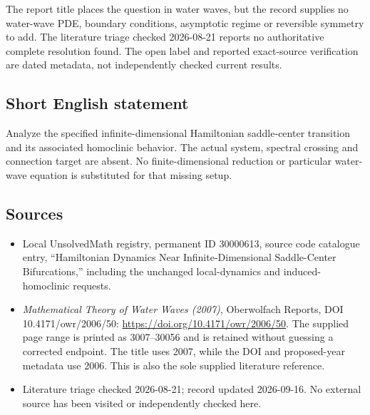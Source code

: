 \documentclass[11pt]{article}
\begin{document}
The report title places the question in water waves, but the record supplies no water-wave PDE, boundary conditions, asymptotic regime or reversible symmetry to add. The literature triage checked 2026-08-21 reports no authoritative complete resolution found. The open label and reported exact-source verification are dated metadata, not independently checked current results.
\subsection{Short English statement}
Analyze the specified infinite-dimensional Hamiltonian saddle-center transition and its associated homoclinic behavior. The actual system, spectral crossing and connection target are absent. No finite-dimensional reduction or particular water-wave equation is substituted for that missing setup.
\subsection{Sources}
\begin{itemize}
\item Local UnsolvedMath registry, permanent ID 30000613, source code catalogue entry, ``Hamiltonian Dynamics Near Infinite-Dimensional Saddle-Center Bifurcations,'' including the unchanged local-dynamics and induced-homoclinic requests.
\item \emph{Mathematical Theory of Water Waves (2007)}, Oberwolfach Reports, DOI 10.4171/owr/2006/50: \url{https://doi.org/10.4171/owr/2006/50}. The supplied page range is printed as 3007--30056 and is retained without guessing a corrected endpoint. The title uses 2007, while the DOI and proposed-year metadata use 2006. This is also the sole supplied literature reference.
\item Literature triage checked 2026-08-21; record updated 2026-09-16. No external source has been visited or independently checked here.
\end{itemize}
\end{document}

